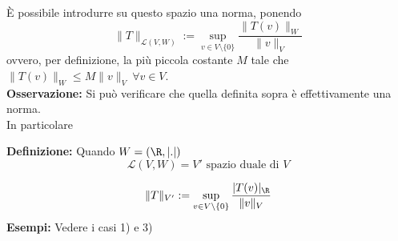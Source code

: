 È possibile introdurre su questo spazio una norma, ponendo 
\[\|T\|_{\mathcal L(V,W)}:=\sup_{v\in V\setminus \{0\} }\frac{\|T(v)\|_W}{\|v\|_V}\]
ovvero, per definizione, la più piccola costante $M$ tale che $\|T(v)\|_W\le M \|v\|_V\ \forall v\in V$.
\\\textbf{Osservazione:} Si può verificare che quella definita sopra è effettivamente una norma.\\
In particolare
\begin{tcolorbox}
	\textbf{Definizione: }Quando $W=(\R,|.|)$ 
	\[\mathcal L (V,W)=V'\text{ spazio duale di }V\]
\end{tcolorbox}
\[\|T\|_{V'}:=\sup_{v\in V\setminus \{0\} } \frac{|T(v)|_{\R}}{\|v\|_V}\]
\textbf{Esempi: }Vedere i casi 1) e 3)


